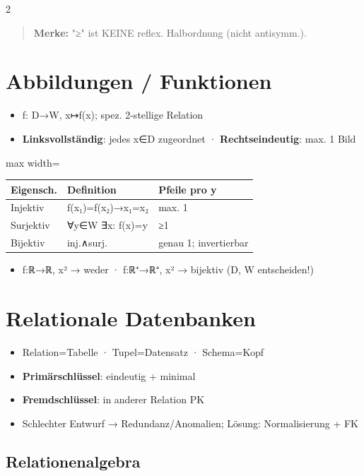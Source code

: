 \documentclass[10pt, a4paper]{article}
\begin{document}
\begin{multicols}{2}
\begin{quote}
\textbf{Merke:} "≥" ist KEINE reflex. Halbordnung (nicht antisymm.).
\end{quote}


\section{Abbildungen / Funktionen}

\begin{itemize}
  \item f: D→W, x↦f(x); spez. 2-stellige Relation
  \item \textbf{Linksvollständig}: jedes x∈D zugeordnet · \textbf{Rechtseindeutig}: max. 1 Bild
\end{itemize}


{\small
\begin{adjustbox}{max width=\linewidth}
{\scriptsize
\begin{tabular}{lll}
\toprule
\textbf{Eigensch.} & \textbf{Definition} & \textbf{Pfeile pro y} \\
\midrule
Injektiv & f(x₁)=f(x₂)→x₁=x₂ & max. 1 \\
Surjektiv & ∀y∈W ∃x: f(x)=y & ≥1 \\
Bijektiv & inj.∧surj. & genau 1; invertierbar \\
\bottomrule
\end{tabular}
}
\end{adjustbox}
}


\begin{itemize}
  \item f:ℝ→ℝ, x² → weder · f:ℝ⁺→ℝ⁺, x² → bijektiv (D, W entscheiden!)
\end{itemize}


\section{Relationale Datenbanken}

\begin{itemize}
  \item Relation=Tabelle · Tupel=Datensatz · Schema=Kopf
  \item \textbf{Primärschlüssel}: eindeutig + minimal
  \item \textbf{Fremdschlüssel}: in anderer Relation PK
  \item Schlechter Entwurf → Redundanz/Anomalien; Lösung: Normalisierung + FK
\end{itemize}


\subsection{Relationenalgebra}


\end{multicols}
\end{document}
